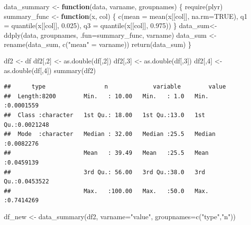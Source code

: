 \documentclass[
]{article}
\newenvironment{Shaded}{\begin{snugshade}}{\end{snugshade}}
\newcommand{\AttributeTok}[1]{\textcolor[rgb]{0.77,0.63,0.00}{#1}}
\newcommand{\ConstantTok}[1]{\textcolor[rgb]{0.00,0.00,0.00}{#1}}
\newcommand{\ControlFlowTok}[1]{\textcolor[rgb]{0.13,0.29,0.53}{\textbf{#1}}}
\newcommand{\DecValTok}[1]{\textcolor[rgb]{0.00,0.00,0.81}{#1}}
\newcommand{\FloatTok}[1]{\textcolor[rgb]{0.00,0.00,0.81}{#1}}
\newcommand{\FunctionTok}[1]{\textcolor[rgb]{0.00,0.00,0.00}{#1}}
\newcommand{\NormalTok}[1]{#1}
\newcommand{\OtherTok}[1]{\textcolor[rgb]{0.56,0.35,0.01}{#1}}
\newcommand{\StringTok}[1]{\textcolor[rgb]{0.31,0.60,0.02}{#1}}
\begin{document}
\begin{Shaded}
\begin{Highlighting}[]
\NormalTok{data\_summary }\OtherTok{\textless{}{-}} \ControlFlowTok{function}\NormalTok{(data, varname, groupnames)}
\NormalTok{\{}
  \FunctionTok{require}\NormalTok{(plyr)}
\NormalTok{  summary\_func }\OtherTok{\textless{}{-}} \ControlFlowTok{function}\NormalTok{(x, col)}
\NormalTok{  \{}
    \FunctionTok{c}\NormalTok{(}\AttributeTok{mean =} \FunctionTok{mean}\NormalTok{(x[[col]], }\AttributeTok{na.rm=}\ConstantTok{TRUE}\NormalTok{),}
      \AttributeTok{q1 =} \FunctionTok{quantile}\NormalTok{(x[[col]], }\FloatTok{0.025}\NormalTok{), }\AttributeTok{q3 =} \FunctionTok{quantile}\NormalTok{(x[[col]], }\FloatTok{0.975}\NormalTok{))}
\NormalTok{  \}}
\NormalTok{  data\_sum}\OtherTok{\textless{}{-}}\FunctionTok{ddply}\NormalTok{(data, groupnames, }\AttributeTok{.fun=}\NormalTok{summary\_func,}
\NormalTok{                  varname)}
\NormalTok{  data\_sum }\OtherTok{\textless{}{-}} \FunctionTok{rename}\NormalTok{(data\_sum, }\FunctionTok{c}\NormalTok{(}\StringTok{"mean"} \OtherTok{=}\NormalTok{ varname))}
  \FunctionTok{return}\NormalTok{(data\_sum)}
\NormalTok{\}}

\NormalTok{df2 }\OtherTok{\textless{}{-}}\NormalTok{ df}
\NormalTok{df2[,}\DecValTok{2}\NormalTok{] }\OtherTok{\textless{}{-}} \FunctionTok{as.double}\NormalTok{(df[,}\DecValTok{2}\NormalTok{])}
\NormalTok{df2[,}\DecValTok{3}\NormalTok{] }\OtherTok{\textless{}{-}} \FunctionTok{as.double}\NormalTok{(df[,}\DecValTok{3}\NormalTok{])}
\NormalTok{df2[,}\DecValTok{4}\NormalTok{] }\OtherTok{\textless{}{-}} \FunctionTok{as.double}\NormalTok{(df[,}\DecValTok{4}\NormalTok{])}
\FunctionTok{summary}\NormalTok{(df2)}
\end{Highlighting}
\end{Shaded}

\begin{verbatim}
##      type                 n             variable        value          
##  Length:8200        Min.   : 10.00   Min.   : 1.0   Min.   :0.0001559  
##  Class :character   1st Qu.: 18.00   1st Qu.:13.0   1st Qu.:0.0021248  
##  Mode  :character   Median : 32.00   Median :25.5   Median :0.0082276  
##                     Mean   : 39.49   Mean   :25.5   Mean   :0.0459139  
##                     3rd Qu.: 56.00   3rd Qu.:38.0   3rd Qu.:0.0453522  
##                     Max.   :100.00   Max.   :50.0   Max.   :0.7414269
\end{verbatim}

\begin{Shaded}
\begin{Highlighting}[]
\NormalTok{df\_new }\OtherTok{\textless{}{-}} \FunctionTok{data\_summary}\NormalTok{(df2, }\AttributeTok{varname=}\StringTok{"value"}\NormalTok{,}
                           \AttributeTok{groupnames=}\FunctionTok{c}\NormalTok{(}\StringTok{"type"}\NormalTok{,}\StringTok{"n"}\NormalTok{))}
\end{Highlighting}
\end{Shaded}
\end{document}
